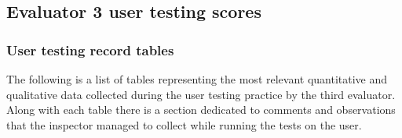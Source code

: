 \subsection{Evaluator 3 user testing scores}

\subsubsection*{User testing record tables}
The following is a list of tables representing the most relevant quantitative and qualitative data collected during the user testing practice by the third evaluator.
Along with each table there is a section dedicated to comments and observations that the inspector managed to collect while running the tests on the user.

\vspace{0.8cm}


